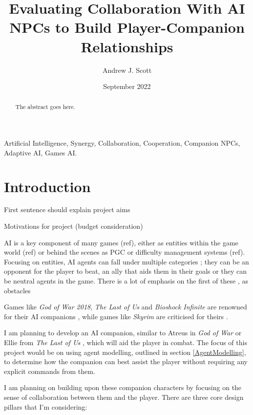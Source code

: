 \documentclass{IEEEtran}
\title{Evaluating Collaboration With AI NPCs to Build Player-Companion Relationships}
\author{Andrew J. Scott}
\date{September 2022}
\begin{document}
	\maketitle

\begin{abstract}
The abstract goes here.
\end{abstract}

 \begin{IEEEkeywords}
Artificial Intelligence, Synergy, Collaboration, Cooperation, Companion NPCs, Adaptive AI, Games AI.
\end{IEEEkeywords}

\section{Introduction}
\label{Intro}

First sentence should explain project aims

Motivations for project (budget consideration)

AI is a key component of many games (ref), either as entities within the game world (ref) or behind the scenes as PGC or difficulty management systems (ref). Focusing on entities, AI agents can fall under multiple categories \cite{GDCMindYourStep}; they can be an opponent for the player to beat, an ally that aids them in their goals or they can be neutral agents in the game. There is a lot of emphasis on the first of these \cite{GDCMindYourStep}, as obstacles

Games like \textit{God of War 2018}, \textit{The Last of Us} and \textit{Bioshock Infinite} are renowned for their AI companions \cite{PlayDontShow}, while games like \textit{Skyrim} are criticised for theirs \cite{tremblay2013adaptive}.

I am planning to develop an AI companion, similar to Atreus in \textit{God of War} \cite{GDCAtreus} or Ellie from \textit{The Last of Us} \cite{GAIP2EllieAI}, which will aid the player in combat. The focus of this project would be on using agent modelling, outlined in section \ref{AgentModelling}, to determine how the companion can best assist the player without requiring any explicit commands from them.

I am planning on building upon these companion characters by focusing on the sense of collaboration between them and the player. There are three core design pillars that I’m considering:
\end{document}
